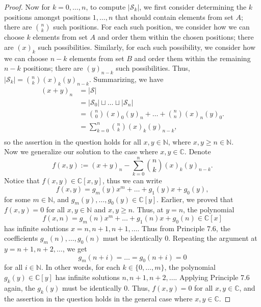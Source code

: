 \documentclass{article}
\begin{document}
\begin{enumerate}[label={\bf Q\arabic*:}]
\begin{proof}
      Now for $k=0,\ldots,n$, to compute $|\mathcal{S}_k|$, we first
      consider determining the $k$ positions amongst positions $1,\ldots,n$
      that should contain elements from set $A$; there are $\binom{n}{k}$
      such positions. For each such position, we consider how we can choose
      $k$ elements from set $A$ and order them within the chosen positions;
      there are $(x)_k$ such possibilities. Similarly, for each such
      possibility, we consider how we can choose $n-k$ elements from set
      $B$ and order them within the remaining $n-k$ positions; there are
      $(y)_{n-k}$ such possibilities. Thus,
      $|\mathcal{S}_k|=\binom{n}{k}(x)_k(y)_{n-k}$. Summarizing, we have
      \begin{align*}
        (x+y)_n &=|\mathcal{S}| \\
        &=|\mathcal{S}_0|\sqcup\ldots\sqcup|\mathcal{S}_n| \\
        &=\binom{n}{0}(x)_0(y)_n +\ldots +\binom{n}{n}(x)_n(y)_0. \\
        &=\sum_{k=0}^n\binom{n}{k}(x)_k(y)_{n-k}, \\
      \end{align*}
      so the assertion in the question holds for all $x,y\in\mathbb{N}$,
      where $x,y\geq n\in\mathbb{N}$. \\

      Now we generalize our solution to the case where $x,y\in\mathbb{C}$.
      Denote \[f(x,y):=(x+y)_n-\sum_{k=0}^n\binom{n}{k}(x)_k(y)_{n-k}.\]
      Notice that $f(x,y)\in\mathbb{C}[x,y]$, thus we can write
      \[f(x,y)= g_m(y)x^m+\ldots+g_1(y)x+g_0(y),\]
      for some $m\in\mathbb{N}$, and
      $g_m(y),\ldots,g_0(y)\in\mathbb{C}[y]$. Earlier, we proved that
      $f(x,y)=0$ for all $x,y\in\mathbb{N}$ and $x,y\geq n$. Thus, at
      $y=n$, the polynomial
      \[f(x,n)= g_m(n)x^m+\ldots+g_1(n)x+g_0(n) \in\mathbb{C}[x]\]
      has infinite solutions $x=n,n+1,n+1,\ldots$. Thus from Principle 7.6,
      the coefficients $g_m(n),\ldots,g_0(n)$ must be identically 0.
      Repeating the argument at $y=n+1,n+2,\ldots$, we get
      \[g_m(n+i)=\ldots=g_0(n+i)=0\]
      for all $i\in\mathbb{N}$. In other words, for each
      $k\in\{0,\ldots,m\}$, the polynomial $g_k(y)\in\mathbb{C}[y]$ has
      infinite solutions $n,n+1,n+2,\ldots$. Applying Principle 7.6 again,
      the $g_k(y)$ must be identically 0. Thus, $f(x,y)=0$ for all
      $x,y\in\mathbb{C}$, and the assertion in the question holds in the
      general case where $x,y\in\mathbb{C}$.
    \end{proof}
\end{enumerate}
\end{document}
